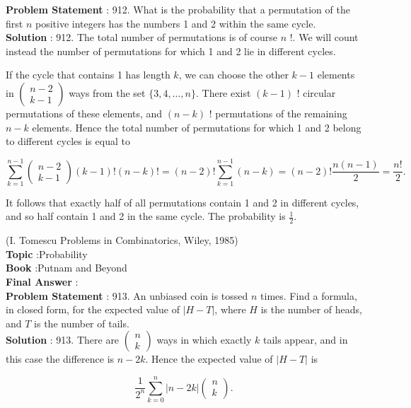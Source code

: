 \documentclass[10pt]{article}
\begin{document}
\textbf{Problem Statement} :
912. What is the probability that a permutation of the first $n$ positive integers has the numbers 1 and 2 within the same cycle.
\\
\textbf{Solution} :
912. The total number of permutations is of course $n$ !. We will count instead the number of permutations for which 1 and 2 lie in different cycles.

If the cycle that contains 1 has length $k$, we can choose the other $k-1$ elements in $\left(\begin{array}{c}n-2 \\ k-1\end{array}\right)$ ways from the set $\{3,4, \ldots, n\}$. There exist $(k-1)$ ! circular permutations of these elements, and $(n-k)$ ! permutations of the remaining $n-k$ elements. Hence the total number of permutations for which 1 and 2 belong to different cycles is equal to

$$
\sum_{k=1}^{n-1}\left(\begin{array}{l}
n-2 \\
k-1
\end{array}\right)(k-1) !(n-k) !=(n-2) ! \sum_{k=1}^{n-1}(n-k)=(n-2) ! \frac{n(n-1)}{2}=\frac{n !}{2} .
$$

It follows that exactly half of all permutations contain 1 and 2 in different cycles, and so half contain 1 and 2 in the same cycle. The probability is $\frac{1}{2}$.

(I. Tomescu Problems in Combinatorics, Wiley, 1985)
\\
\textbf{Topic} :Probability\\
\textbf{Book} :Putnam and Beyond\\
\textbf{Final Answer} :\\


\textbf{Problem Statement} :
913. An unbiased coin is tossed $n$ times. Find a formula, in closed form, for the expected value of $|H-T|$, where $H$ is the number of heads, and $T$ is the number of tails.
\\
\textbf{Solution} :
913. There are $\left(\begin{array}{l}n \\ k\end{array}\right)$ ways in which exactly $k$ tails appear, and in this case the difference is $n-2 k$. Hence the expected value of $|H-T|$ is

$$
\frac{1}{2^{n}} \sum_{k=0}^{n}|n-2 k|\left(\begin{array}{l}
n \\
k
\end{array}\right) .
$$
\end{document}
